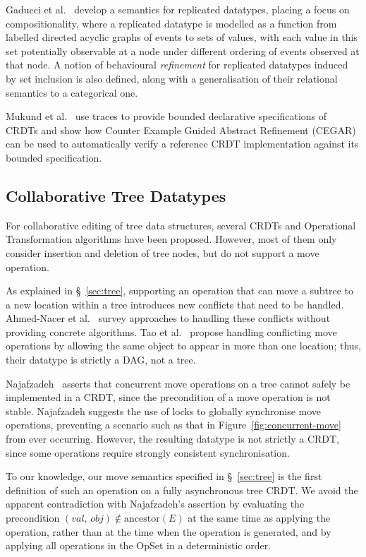 Gaducci et al.~\cite{DBLP:conf/coordination/GadducciMR17} develop a semantics for replicated datatypes, placing a focus on compositionality, where a replicated datatype is modelled as a function from labelled directed acyclic graphs of events to sets of values, with each value in this set potentially observable at a node under different ordering of events observed at that node.
A notion of behavioural \emph{refinement} for replicated datatypes induced by set inclusion is also defined, along with a generalisation of their relational semantics to a categorical one.

Mukund et al.~\cite{DBLP:conf/atva/MukundRS15} use traces to provide bounded declarative specifications of CRDTs and show how Counter Example Guided Abstract Refinement (CEGAR) can be used to automatically verify a reference CRDT implementation against its bounded specification.

\subsection{Collaborative Tree Datatypes}

For collaborative editing of tree data structures, several CRDTs \cite{Martin:2010ih,Kleppmann:2016ve} and Operational Transformation algorithms \cite{Jungnickel:2016cb,Ignat:2003jy,Davis:2002iv} have been proposed.
However, most of them only consider insertion and deletion of tree nodes, but do not support a move operation.

As explained in \S~\ref{sec:tree}, supporting an operation that can move a subtree to a new location within a tree introduces new conflicts that need to be handled.
Ahmed-Nacer et al.~\cite{AhmedNacer:2012us} survey approaches to handling these conflicts without providing concrete algorithms.
Tao et al.~\cite{Tao:2015gd} propose handling conflicting move operations by allowing the same object to appear in more than one location; thus, their datatype is strictly a DAG, not a tree.

Najafzadeh~\cite{Najafzadeh:2017vk,Najafzadeh:2018bw} asserts that concurrent move operations on a tree cannot safely be implemented in a CRDT, since the precondition of a move operation is not stable.
Najafzadeh suggests the use of locks to globally synchronise move operations, preventing a scenario such as that in Figure~\ref{fig:concurrent-move} from ever occurring.
However, the resulting datatype is not strictly a CRDT, since some operations require strongly consistent synchronisation.

To our knowledge, our move semantics specified in \S~\ref{sec:tree} is the first definition of such an operation on a fully asynchronous tree CRDT.
We avoid the apparent contradiction with Najafzadeh's assertion by evaluating the precondition $(\mathit{val},\, \mathit{obj}) \notin \mathrm{ancestor}(E)$ at the same time as applying the operation, rather than at the time when the operation is generated, and by applying all operations in the OpSet in a deterministic order.
